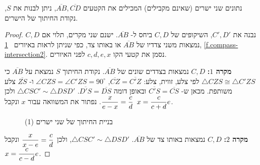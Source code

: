\begin{theorem}
נתונים שני ישרים (שאינם מקבילים) המכילים את הקטעים
$\overline{AB},\overline{CD}$,
ניתן לבנות את
$S$,
נקודת החיתוך של הישרים.
\end{theorem}
\begin{proof}
נבנה את
$C',D'$,
השיקופים של
$C,D$
ביחס ל-%
$\overline{AB}$.
ישנם שני מקרים, תלוי אם 
$C,D$ 
נמצאות משני צדדיו של
$\overline{AB}$
או באותו צד, כפי שניתן לראות באיורים%
~\ref{f.compass-intersection1}, \ref{f.compass-intersection2}.
נסמן את קטעי הקו 
$c,d,e,x$
לפני האיורים.

\textbf{מקרה $1$:}
$C,D$ 
נמצאות בצדדים שונים של
$\overline{AB}$.
נקודת החיתוך
$S$
נמצאת על 
$\overline{AB}$
כי
$\triangle CZS\cong \triangle C'ZS$
לפי צלע, זווית, צלע:
$\overline{CZ}=\overline{C'Z}$,
$\angle CZS = \angle C'ZS = 90^\circ$
ו-%
$\overline{ZS}$
צלע משותפת. מכאן ש-%
$\overline{C'S}=\overline{CS}$
ובאופן דומה
$\overline{D'S}=\overline{DS}$.
$\triangle CSC'\sim\triangle DSD'$
ולכן
$\displaystyle\frac{x}{e-x} = \displaystyle\frac{c}{d}$.
נפתור את המשוואה עבור
$x$
ונקבל
$x=\displaystyle\frac{c}{c+d}e$.
\begin{figure}[tb]
\begin{center}
\end{center}
\caption{בניית החיתוך של שני ישרים (1)}\label{f.compass-intersection1}
\end{figure}

\textbf{מקרה $2$:}
$C,D$ 
נמצאות באותו צד של
$\overline{AB}$.
$\triangle CSC'\sim\triangle DSD'$,
ולכן
$\displaystyle\frac{x}{x-e}=\displaystyle\frac{c}{d}$
ונקבל 
$x=\displaystyle\frac{c}{c-d}e$.


\end{proof}
